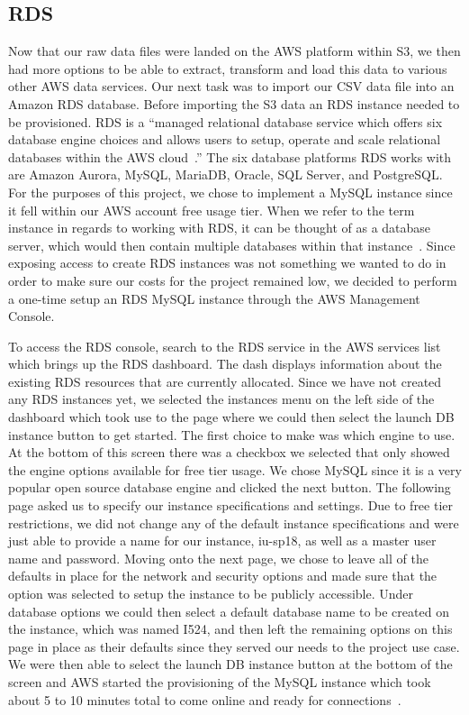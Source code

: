 \subsection{RDS}

Now that our raw data files were landed on the AWS platform within S3, we then 
had more options to be able to extract, transform and load this data to 
various other AWS data services. Our next task was to import our CSV data 
file into an Amazon RDS database. Before importing the S3 data an RDS instance 
needed to be provisioned. RDS is a ``managed relational database service which 
offers six database engine choices and allows users to setup, operate and 
scale relational databases within the AWS 
cloud~\cite{hid-sp18-521-rds-mysql}.'' The six database platforms RDS works 
with are Amazon Aurora, MySQL, MariaDB, Oracle, SQL Server, and PostgreSQL. 
For the purposes of this project, we chose to implement a MySQL instance since 
it fell within our AWS account free usage tier. When we refer to the term 
instance in regards to working with RDS, it can be thought of as a database 
server, which would then contain multiple databases within that 
instance~\cite{hid-sp18-521-rds-mysql}. Since exposing access to create RDS 
instances was not something we wanted to do in order to make sure our costs 
for the project remained low, we decided to perform a one-time setup an RDS 
MySQL instance through the AWS Management Console.  

To access the RDS console, search to the RDS service in the AWS services list 
which brings up the RDS dashboard. The dash displays information about the 
existing RDS resources that are currently allocated. Since we have not created 
any RDS instances yet, we selected the instances menu on the left side of the 
dashboard which took use to the page where we could then select the launch DB 
instance button to get started. The first choice to make was which engine to 
use. At the bottom of this screen there was a checkbox we selected that only 
showed the engine options available for free tier usage. We chose MySQL since 
it is a very popular open source database engine and clicked the next button. 
The following page asked us to specify our instance specifications and 
settings. Due to free tier restrictions, we did not change any of the default 
instance specifications and were just able to provide a name for our instance, 
iu-sp18, as well as a master user name and password. Moving onto the next 
page, we chose to leave all of the defaults in place for the network and 
security options and made sure that the option was selected to setup the 
instance to be publicly accessible. Under database options we could then 
select a default database name to be created on the instance, which was named 
I524, and then left the remaining options on this page in place as their 
defaults since they served our needs to the project use case. We were then 
able to select the launch DB instance button at the bottom of the screen and 
AWS started the provisioning of the MySQL instance which took about 5 to 10 
minutes total to come online and ready for 
connections~\cite{hid-sp18-521-rds-mysql}. 


